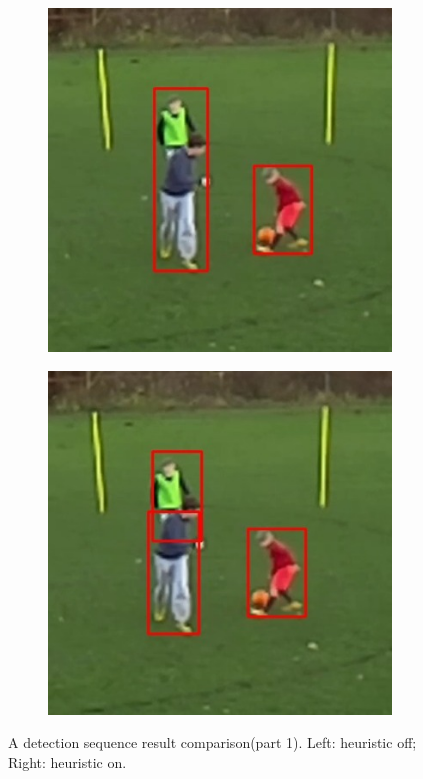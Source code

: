 \documentclass{article}
\begin{document}
\begin{figure}[h!]
\begin{subfigure}[b]{0.5\linewidth}
	\includegraphics[scale=0.4]{report/pic/3_new/off_seq_3.jpg} 
  \end{subfigure}
  \begin{subfigure}[b]{0.5\linewidth}
  \centering
	\includegraphics[scale=0.4]{report/pic/3_new/on_seq_3.jpg} 
  \end{subfigure}
  \caption{A detection sequence result comparison(part 1). Left: heuristic off; Right: heuristic on.}
\end{figure}
\end{document}
